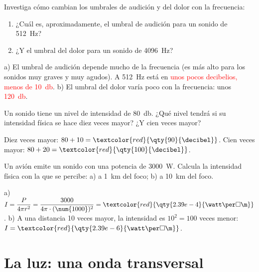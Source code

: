 \begin{exercise}
    Investiga cómo cambian los umbrales de audición y del dolor con la frecuencia:
    \begin{enumerate}[label=\alph*)]
        \item ¿Cuál es, aproximadamente, el umbral de audición para un sonido de \qty{512}{\hertz}?
        \item ¿Y el umbral del dolor para un sonido de \qty{4096}{\hertz}?
    \end{enumerate}
    \begin{solu}
        a) El umbral de audición depende mucho de la frecuencia (es más alto para los sonidos muy graves y muy agudos). A \qty{512}{\hertz} está en \textcolor{red}{unos pocos decibelios, menos de \qty{10}{\decibel}}.
        b) El umbral del dolor varía poco con la frecuencia: unos \textcolor{red}{\qty{120}{\decibel}}.
    \end{solu}
\end{exercise}

\begin{exercise}
    Un sonido tiene un nivel de intensidad de \qty{80}{\decibel}. ¿Qué nivel tendrá si su intensidad física se hace diez veces mayor? ¿Y cien veces mayor?
    \begin{solu}
        Diez veces mayor: \(80 + 10 = \textcolor{red}{\qty{90}{\decibel}}\). Cien veces mayor: \(80 + 20 = \textcolor{red}{\qty{100}{\decibel}}\).
    \end{solu}
\end{exercise}

\begin{exercise}
    Un avión emite un sonido con una potencia de \qty{3000}{\watt}. Calcula la intensidad física con la que se percibe: a) a \qty{1}{\km} del foco; b) a \qty{10}{\km} del foco.
    \begin{solu}
        a) \(I = \dfrac{P}{4\pi r^2} = \dfrac{3000}{4\pi \cdot (\num{1000})^2} = \textcolor{red}{\qty{2.39e-4}{\watt\per\square\m}}\).
        b) A una distancia 10 veces mayor, la intensidad es \(10^2 = 100\) veces menor: \(I = \textcolor{red}{\qty{2.39e-6}{\watt\per\square\m}}\).
    \end{solu}
\end{exercise}

\section{La luz: una onda transversal}

